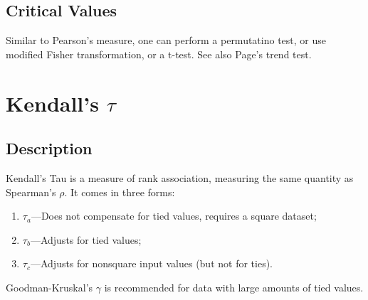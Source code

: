 \documentclass[11pt]{article}
\begin{document}
\subsection{Critical Values}
Similar to Pearson's measure, one can perform a permutatino test, or use modified Fisher transformation, or a t-test.  See also Page's trend test.









\section{Kendall's $\tau$} %
\label{section:kendalltau}
\subsection{Description}
Kendall's Tau is a measure of rank association, measuring the same quantity as Spearman's $\rho$.  It comes in three forms:
\begin{enumerate}
\item $\tau_{a}$---Does not compensate for tied values, requires a square dataset;
\item $\tau_{b}$---Adjusts for tied values;
\item $\tau_{c}$---Adjusts for nonsquare input values (but not for ties).
\end{enumerate}
Goodman-Kruskal's $\gamma$ is recommended for data with large amounts of tied values.
\end{document}
